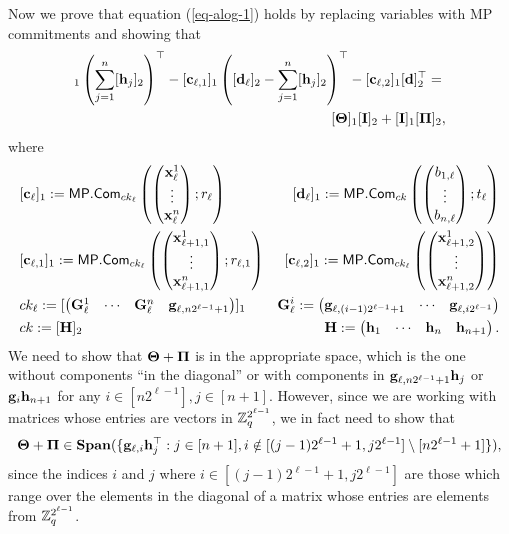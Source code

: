 Now we prove that equation (\ref{eq-alog-1}) holds by replacing variables with MP commitments and showing that
\begin{align*}
[\vecb{c}_\ell]_1\left(\sum_{j=1}^n[\vecb{h}_j]_2\right)^\top-[\vecb{c}_{\ell,1}]_1\left([\vecb{d}_\ell]_2-\sum_{j=1}^n[\vecb{h}_j]_2\right)^\top-[\vecb{c}_{\ell,2}]_1[\vecb{d}]_2^\top
=&\\
[\matr{\Theta}]_1[\matr{I}]_2+[\matr{I}]_1[\matr{\Pi}]_2&,
\end{align*}
where
\begin{align*}
&[\mathbf{c}_\ell]_1:=\mathsf{MP}.\mathsf{Com}_{ck_\ell}\left(\left(\begin{matrix}\mathbf{x}^1_\ell\\\vdots\\\mathbf{x}^n_\ell\end{matrix}\right);r_\ell\right)
&[\mathbf{d}_\ell]_1:=\mathsf{MP}.\mathsf{Com}_{ck}\left(\left(\begin{matrix}b_{1,\ell}\\\vdots\\b_{n,\ell}\end{matrix}\right);t_\ell\right)\\
&[\mathbf{c}_{\ell,1}]_1:=\mathsf{MP}.\mathsf{Com}_{ck_\ell}\left(\left(\begin{matrix}\mathbf{x}^1_{\ell+1,1}\\\vdots\\\mathbf{x}^n_{\ell+1,1}\end{matrix}\right);r_{\ell,1}\right)
&[\mathbf{c}_{\ell,2}]_1:=\mathsf{MP}.\mathsf{Com}_{ck_\ell}\left(\left(\begin{matrix}\mathbf{x}^1_{\ell+1,2}\\\vdots\\\mathbf{x}^n_{\ell+1,2}\end{matrix}\right)\right)\\
&ck_\ell:=[\left(\begin{matrix}\mathbf{G}^1_{\ell}&\cdots&\mathbf{{G}}^n_{\ell} & \mathbf{g}_{\ell,n2^{\ell-1}+1}\end{matrix}\right)]_1
&\mathbf{{G}}^i_{\ell}:=\left(\begin{matrix}\mathbf{g}_{\ell,(i-1)2^{\ell-1}+1}&\cdots&\mathbf{g}_{\ell,i2^{\ell-1}}\end{matrix}\right)\\
&ck:=[\mathbf{{H}}]_2 &
\mathbf{{H}}:=\left(\begin{matrix}\mathbf{h}_1&\cdots&\mathbf{h}_n&\mathbf{h}_{n+1}\end{matrix}\right).
\end{align*}
We need to show that $\mathbf{{\Theta}}+\mathbf{{\Pi}}$ is in the appropriate space, which is the one without components ``in the diagonal'' or with components in $\mathbf{g}_{\ell,n2^{\ell-1}+1}\mathbf{h}_j$ or $\mathbf{g}_i\mathbf{h}_{n+1}$ for any $i\in[n2^{\ell-1}],j\in[n+1]$. However, since we are working with matrices whose entries are vectors in $\mathbb{Z}_q^{2^{\ell-1}}$, we in fact need to show that
$$
\mathbf{{\Theta}}+\mathbf{{\Pi}}\in\mathbf{Span}(\{\mathbf{g}_{\ell,i}\mathbf{h}_j^\top:j\in[n+1],i\notin[(j-1)2^{\ell-1}+1,j2^{\ell-1}]\setminus[n2^{\ell-1}+1]\}),
$$
since the indices $i$ and $j$ where $i\in[(j-1)2^{\ell-1}+1,j2^{\ell-1}]$ are those which range over the elements in the diagonal of a matrix whose entries are elements from $\mathbb{Z}_q^{2^{\ell-1}}$.

